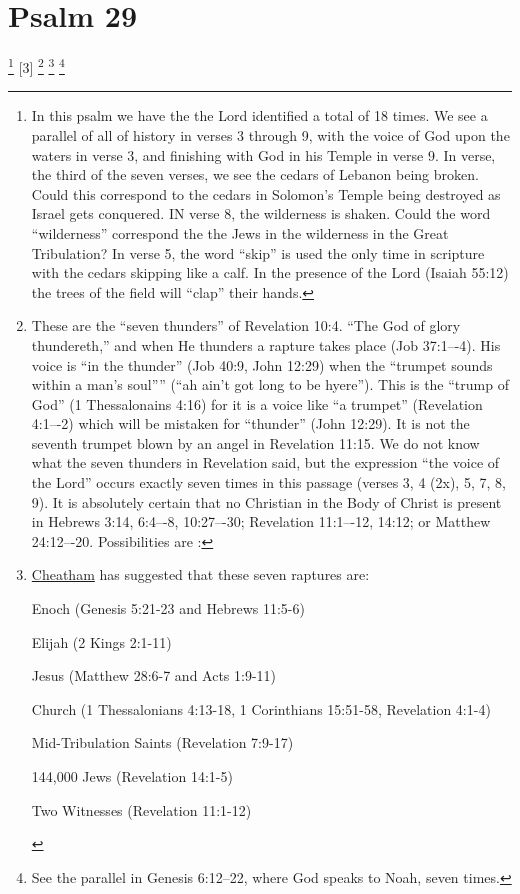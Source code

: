 \chapter{Psalm 29}

\footnote{In this psalm we have the the Lord identified a total of 18 times. We see a parallel of all of history in verses 3 through 9, with the voice of God upon the waters in verse 3, and finishing with God in his Temple in verse 9. In verse, the third of the seven verses, we see the cedars of Lebanon being broken. Could this correspond to the cedars in Solomon's Temple being destroyed as Israel gets conquered. IN verse 8, the wilderness is shaken. Could the word ``wilderness'' correspond the the Jews in the wilderness in the Great Tribulation? In verse 5, the word ``skip'' is used the only time in scripture with the cedars skipping like a calf. In the presence of the Lord (Isaiah 55:12) the trees of the field will ``clap'' their hands.}
[3] \footnote{These are the “seven thunders” of Revelation 10:4. ``The God of glory thundereth,'' and when He thunders a rapture takes place (Job 37:1–-4). His voice is ``in the thunder'' (Job 40:9, John 12:29) when the ``trumpet sounds within a man’s soul''” (“ah ain’t got long to be hyere”). This is the ``trump of God'' (1 Thessalonains 4:16) for it is a voice like ``a trumpet'' (Revelation 4:1–-2) which will be mistaken for ``thunder'' (John 12:29). It is not the seventh trumpet blown by an angel in Revelation 11:15. We do not know what the seven thunders in Revelation said, but the expression ``the voice of the Lord'' occurs exactly seven times in this passage (verses 3, 4 (2x), 5, 7, 8, 9). It is absolutely certain that no Christian in the Body of Christ is present in Hebrews 3:14, 6:4–-8, 10:27–-30; Revelation 11:1–-12, 14:12; or Matthew 24:12–-20. Possibilities are \cite{Ruckman1992Psalms}: }    \footnote{\href{http://www.devotional.net/uploads/147/95775.pdf}{Cheatham} has suggested that these seven raptures are: \begin{compactenum}
    \item Enoch (Genesis 5:21-23 and Hebrews 11:5-6)
    \item Elijah (2 Kings 2:1-11)
    \item Jesus (Matthew 28:6-7 and Acts 1:9-11)
    \item Church (1 Thessalonians 4:13-18, 1 Corinthians 15:51-58, Revelation 4:1-4)
    \item Mid-Tribulation Saints (Revelation 7:9-17)
    \item 144,000 Jews (Revelation 14:1-5)
    \item Two Witnesses (Revelation 11:1-12)
\end{compactenum} }  \footnote{See the parallel in Genesis 6:12--22, where God speaks to Noah, seven times.}
